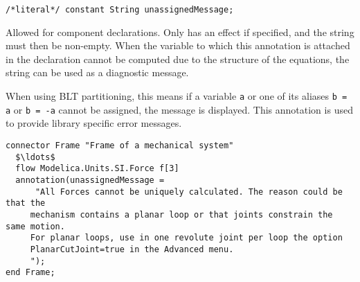 \begin{annotationdefinition}[unassignedMessage]
\begin{synopsis}\begin{lstlisting}
/*literal*/ constant String unassignedMessage;
\end{lstlisting}\end{synopsis}
\begin{semantics}
Allowed for component declarations.
Only has an effect if specified, and the string must then be non-empty.
When the variable to which this annotation is attached in the declaration cannot be computed due to the structure of the equations, the string can be used as a diagnostic message.

\begin{nonnormative}
When using BLT partitioning, this means if a variable \lstinline!a! or one of its aliases \lstinline!b = a! or \lstinline!b = -a! cannot be assigned, the message is displayed.
This annotation is used to provide library specific error messages.
\end{nonnormative}

\begin{example}
\begin{lstlisting}[language=modelica]
connector Frame "Frame of a mechanical system"
  $\ldots$
  flow Modelica.Units.SI.Force f[3]
  annotation(unassignedMessage =
      "All Forces cannot be uniquely calculated. The reason could be that the
     mechanism contains a planar loop or that joints constrain the same motion.
     For planar loops, use in one revolute joint per loop the option
     PlanarCutJoint=true in the Advanced menu.
     ");
end Frame;
\end{lstlisting}
\end{example}
\end{semantics}
\end{annotationdefinition}

